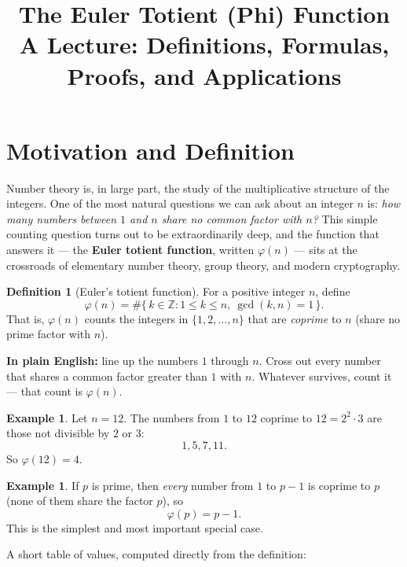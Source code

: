 \documentclass[11pt]{article}
\title{\Large\bfseries The Euler Totient (Phi) Function\\[4pt]
\large A Lecture: Definitions, Formulas, Proofs, and Applications}
\author{}
\date{}
\theoremstyle{definition}
\newtheorem{definition}[theorem]{Definition}
\newtheorem{example}[theorem]{Example}
\theoremstyle{remark}
\newcommand{\Z}{\mathbb{Z}}
\begin{document}
\maketitle
\thispagestyle{fancy}

\tableofcontents

\section{Motivation and Definition}

Number theory is, in large part, the study of the multiplicative structure of the integers. One of the most natural questions we can ask about an integer $n$ is: \emph{how many numbers between $1$ and $n$ share no common factor with $n$?} This simple counting question turns out to be extraordinarily deep, and the function that answers it — the \textbf{Euler totient function}, written $\varphi(n)$ — sits at the crossroads of elementary number theory, group theory, and modern cryptography.

\begin{definition}[Euler's totient function]
For a positive integer $n$, define
\[
\varphi(n) = \#\{\, k \in \Z : 1 \le k \le n,\ \gcd(k,n) = 1 \,\}.
\]
That is, $\varphi(n)$ counts the integers in $\{1, 2, \dots, n\}$ that are \emph{coprime} to $n$ (share no prime factor with $n$).
\end{definition}

\noindent\textbf{In plain English:} line up the numbers $1$ through $n$. Cross out every number that shares a common factor greater than $1$ with $n$. Whatever survives, count it — that count is $\varphi(n)$.

\begin{example}
Let $n = 12$. The numbers from $1$ to $12$ coprime to $12 = 2^2 \cdot 3$ are those not divisible by $2$ or $3$:
\[
1, 5, 7, 11.
\]
So $\varphi(12) = 4$.
\end{example}

\begin{example}
If $p$ is prime, then \emph{every} number from $1$ to $p-1$ is coprime to $p$ (none of them share the factor $p$), so
\[
\varphi(p) = p - 1.
\]
This is the simplest and most important special case.
\end{example}

A short table of values, computed directly from the definition:
\end{document}
